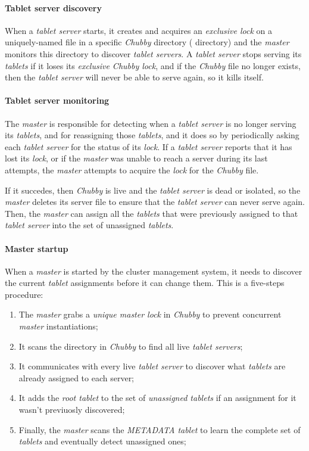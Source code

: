 \paragraph{Tablet server discovery}
When a \emph{tablet server} starts, it creates and acquires an
\emph{exclusive lock} on a uniquely-named file in a specific \emph{Chubby}
directory ( directory) and the \emph{master} monitors this directory
to discover \emph{tablet servers}. A \emph{tablet server} stops serving its
\emph{tablets} if it loses its \emph{exclusive Chubby lock}, and if the
\emph{Chubby} file no longer exists, then the \emph{tablet server} will never
be able to serve again, so it kills itself.

\paragraph{Tablet server monitoring}
The \emph{master} is responsible for detecting when a \emph{tablet server} is no
longer serving its \emph{tablets}, and for reassigning those \emph{tablets},
and it does so by periodically asking each \emph{tablet server} for the status of
its \emph{lock}. If a \emph{tablet server} reports that it has lost its
\emph{lock}, or if the \emph{master} was unable to reach a server during its last
attempts, the \emph{master} attempts to acquire the \emph{lock} for the
\emph{Chubby} file.

If it succedes, then \emph{Chubby} is live and the \emph{tablet server} is dead
or isolated, so the \emph{master} deletes its server file to ensure that the
\emph{tablet server} can never serve again. Then, the \emph{master} can assign
all the \emph{tablets} that were previously assigned to that \emph{tablet
server} into the set of unassigned \emph{tablets}.

\paragraph{Master startup}
When a \emph{master} is started by the cluster management system, it needs to
discover the current \emph{tablet} assignments before it can change them. This
is a five-steps procedure:
\begin{enumerate}
    \item The \emph{master} grabs a \emph{unique master lock} in \emph{Chubby}
    to prevent concurrent \emph{master} instantiations;
    \item It scans the  directory in \emph{Chubby} to find all live
    \emph{tablet servers};
    \item It communicates with every live \emph{tablet server} to discover what
    \emph{tablets} are already assigned to each server;
    \item It adds the \emph{root tablet} to the set of \emph{unassigned tablets}
    if an assignment for it wasn't previuosly discovered;
    \item Finally, the \emph{master} scans the \emph{METADATA tablet} to learn
    the complete set of \emph{tablets} and eventually detect unassigned ones;
\end{enumerate}

